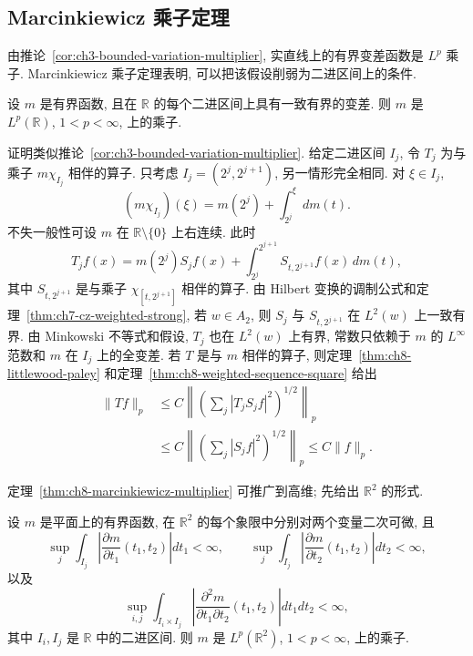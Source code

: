 \subsection{Marcinkiewicz 乘子定理}
\label{sec:ch8-marcinkiewicz-multiplier}

由推论~\ref{cor:ch3-bounded-variation-multiplier}, 实直线上的有界变差函数是 $L^p$ 乘子. Marcinkiewicz 乘子定理表明, 可以把该假设削弱为二进区间上的条件.

\begin{Theorem}
\label{thm:ch8-marcinkiewicz-multiplier}
设 $m$ 是有界函数, 且在 $\mathbb R$ 的每个二进区间上具有一致有界的变差. 则 $m$ 是 $L^p(\mathbb R)$, $1<p<\infty$, 上的乘子.
\end{Theorem}

\begin{Proof}
证明类似推论~\ref{cor:ch3-bounded-variation-multiplier}. 给定二进区间 $I_j$, 令 $T_j$ 为与乘子 $m\chi_{I_j}$ 相伴的算子. 只考虑 $I_j=(2^j,2^{j+1})$, 另一情形完全相同. 对 $\xi\in I_j$,
\[
 (m\chi_{I_j})(\xi)=m(2^j)+\int_{2^j}^{\xi}dm(t).
\]
不失一般性可设 $m$ 在 $\mathbb R\setminus\{0\}$ 上右连续. 此时
\[
 T_jf(x)=m(2^j)S_jf(x)+\int_{2^j}^{2^{j+1}}S_{t,2^{j+1}}f(x)\,dm(t),
\]
其中 $S_{t,2^{j+1}}$ 是与乘子 $\chi_{[t,2^{j+1}]}$ 相伴的算子. 由 Hilbert 变换的调制公式和定理~\ref{thm:ch7-cz-weighted-strong}, 若 $w\in A_2$, 则 $S_j$ 与 $S_{t,2^{j+1}}$ 在 $L^2(w)$ 上一致有界. 由 Minkowski 不等式和假设, $T_j$ 也在 $L^2(w)$ 上有界, 常数只依赖于 $m$ 的 $L^\infty$ 范数和 $m$ 在 $I_j$ 上的全变差. 若 $T$ 是与 $m$ 相伴的算子, 则定理~\ref{thm:ch8-littlewood-paley} 和定理~\ref{thm:ch8-weighted-sequence-square} 给出
\[
\begin{aligned}
 \|Tf\|_p
 &\le C\left\|\left(\sum_j|T_jS_jf|^2\right)^{1/2}\right\|_p\\
 &\le C\left\|\left(\sum_j|S_jf|^2\right)^{1/2}\right\|_p
 \le C\|f\|_p.
\end{aligned}
\]
\end{Proof}

\hypertarget{chapter-08-page-179}{}
定理~\ref{thm:ch8-marcinkiewicz-multiplier} 可推广到高维; 先给出 $\mathbb R^2$ 的形式.

\begin{Theorem}
\label{thm:ch8-marcinkiewicz-multiplier-r2}
设 $m$ 是平面上的有界函数, 在 $\mathbb R^2$ 的每个象限中分别对两个变量二次可微, 且
\[
 \sup_j\int_{I_j}\left|\frac{\partial m}{\partial t_1}(t_1,t_2)\right|dt_1<\infty,
 \qquad
 \sup_j\int_{I_j}\left|\frac{\partial m}{\partial t_2}(t_1,t_2)\right|dt_2<\infty,
\]
以及
\[
 \sup_{i,j}\int_{I_i\times I_j}
 \left|\frac{\partial^2m}{\partial t_1\partial t_2}(t_1,t_2)\right|dt_1dt_2<\infty,
\]
其中 $I_i,I_j$ 是 $\mathbb R$ 中的二进区间. 则 $m$ 是 $L^p(\mathbb R^2)$, $1<p<\infty$, 上的乘子.
\end{Theorem}

